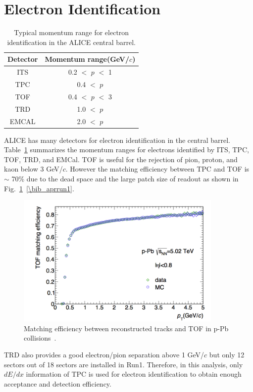 {\section{Electron Identification}
\label{sec_4_eid}
\begin{table}[!h]
  \centering
  \begin{tabular} {cc} \\ \hline
    Detector      &  Momentum range(GeV/$c$) \\ \hline
    ITS           &   0.2 $<$ $p$ $<$ 1 \\
    TPC           &   0.4 $<$ $p$ \\
    TOF           &   0.4 $<$ $p$ $<$ 3 \\
    TRD           &   1.0 $<$ $p$ \\
    EMCAL           &   2.0 $<$ $p$ \\ \hline
  \end{tabular}
  \caption{Typical momentum range for electron identification in the ALICE central barrel.}
  \label{table_4_eid}
\end{table}
ALICE has many detectors for electron identification in the central barrel.
Table~\ref{table_4_eid}  summarizes the momentum ranges for electrons identified by ITS, TPC, TOF, TRD, and EMCal.
TOF is useful for the rejection of pion, proton, and kaon below 3 GeV/$c$. 
However the matching efficiency between TPC and TOF is $\sim$ 70\% due to the dead space and the large patch size of readout as shown in Fig.~\ref{fig_4_tofmatch}~\ref{\bib_aprrun1}. 
\begin{figure}[!h]
  \centering
  \includegraphics[width=10cm]{chap4/figure/TOF/tofmatcheff.png}
  \caption{Matching efficiency between reconstructed tracks and TOF in p-Pb collisions~\cite{bib_aprrun1}. }
  \label{fig_4_tofmatch}
\end{figure}
TRD also provides a good electron/pion separation above 1 GeV/$c$ but only 12 sectors out of 18 sectors are installed in Run1. 
Therefore, in this analysis, only $dE/dx$ information of TPC is used for electron identification to obtain enough acceptance and detection efficiency. 

}
